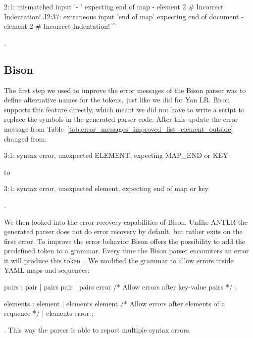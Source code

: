 \begin{textcode}
2:1: mismatched input '- ' expecting end of map
     - element 2 # Incorrect Indentation!
     ^^
2:37: extraneous input 'end of map' expecting end of document
      - element 2 # Incorrect Indentation!
                                          ^
\end{textcode}

.

\subsection{Bison}

The first step we used to improve the error messages of the Bison parser was to define alternative names for the tokens, just like we did for Yan LR. Bison supports this feature directly, which meant we did not have to write a script to replace the symbols in the generated parser code. After this update the error message from Table~\ref{tab:error_messages_improved_list_element_outside} changed from:

\begin{textcode}
  3:1: syntax error, unexpected ELEMENT, expecting MAP_END or KEY
\end{textcode}

to

\begin{textcode}
  3:1: syntax error, unexpected element, expecting end of map or key
\end{textcode}

.

We then looked into the error recovery capabilities of Bison. Unlike ANTLR the generated parser does not do error recovery by default, but rather exits on the first error. To improve the error behavior Bison offers the possibility to add the predefined  token to a grammar. Every time the Bison parser encounters an error it will produce this token~\cite{donnelly2019bison}. We modified the grammar to allow errors inside YAML maps and sequences:

\begin{ccode}
  pairs : pair
        | pairs pair
        | pairs error /* Allow errors after key-value pairs */
        ;

  elements : element
           | elements element
           /* Allow errors after elements of a sequence */
           | elements error
           ;
\end{ccode}

. This way the parser is able to report multiple syntax errors.

